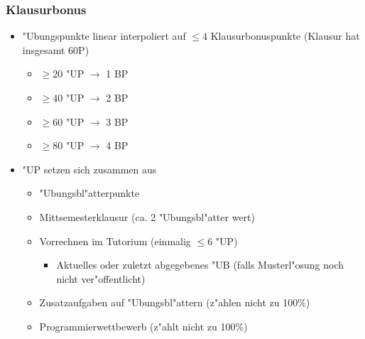 \documentclass[t]{beamer}
\begin{document}
\begin{frame}
  \frametitle{Klausurbonus}
  \begin{itemize}
    \item "Ubungspunkte linear interpoliert auf $\leq 4$ Klausurbonuspunkte
          (Klausur hat insgesamt 60P)
      \begin{itemize}
      \item $\geq 20$ "UP $\rightarrow$ 1 BP
      \item $\geq 40$ "UP $\rightarrow$ 2 BP
      \item $\geq 60$ "UP $\rightarrow$ 3 BP
      \item $\geq 80$ "UP $\rightarrow$ 4 BP
      \end{itemize}
    \item "UP setzen sich zusammen aus
      \begin{itemize}
      \item "Ubungsbl"atterpunkte
      \item Mittsemesterklausur (ca. 2 "Ubungsbl"atter wert)
      \item Vorrechnen im Tutorium (einmalig $\leq 6$ "UP)
      \begin{itemize}
        \item Aktuelles oder zuletzt abgegebenes "UB (falls Musterl"osung noch
              nicht ver"offentlicht)
      \end{itemize}
      \item Zusatzaufgaben auf "Ubungsbl"attern (z"ahlen nicht zu 100\%)
      \item Programmierwettbewerb (z"ahlt nicht zu 100\%)
      \end{itemize}
  \end{itemize}
\end{frame}
\end{document}
